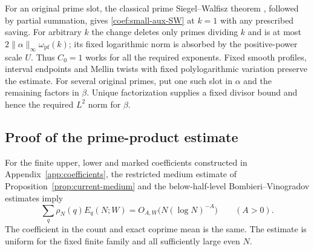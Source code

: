 For an original prime slot, the classical prime Siegel--Walfisz theorem
\cite[Exercise~64]{TaoSW}, followed by partial summation, gives
\eqref{coef:small-aux-SW} at $k=1$ with any prescribed saving.
For arbitrary $k$ the change deletes only primes dividing $k$ and is at
most $2\|\alpha\|_\infty\omega_{\mathrm{pf}}(k)$; its fixed logarithmic norm is
absorbed by the positive-power scale $U$.  Thus $C_0=1$ works for all
the required exponents.  Fixed smooth profiles, interval endpoints and
Mellin twists with fixed polylogarithmic variation preserve the estimate.
For several original primes, put one such slot in $\alpha$ and the
remaining factors in $\beta$.  Unique factorization supplies a fixed
divisor bound and hence the required $L^2$ norm for $\beta$.

\subsection{Proof of the prime-product estimate}

\begin{proposition}\label{coef:prime-product-insertion}
For the finite upper, lower and marked coefficients constructed in
Appendix~\ref{app:coefficients}, the restricted medium estimate of
Proposition~\ref{prop:current-medium} and the below-half-level
Bombieri--Vinogradov estimates imply
\[
 \sum_q\rho_N(q)E_q(N;W)=O_{A,W}\bigl(N(\log N)^{-A}\bigr)
 \qquad(A>0).
\]
The coefficient in the count and exact coprime mean is the same.
The estimate is uniform for the fixed finite family and all sufficiently
large even $N$.
\end{proposition}

